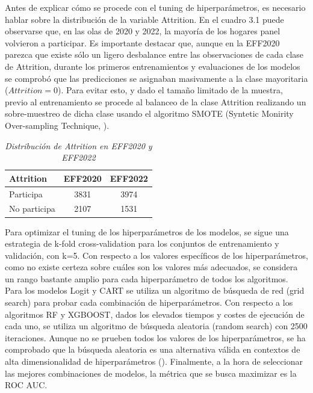 Antes de explicar cómo se procede con el tuning de hiperparámetros, es necesario hablar sobre la distribución de la variable Attrition. En el cuadro 3.1 puede observarse que, en las olas de 2020 y 2022, la mayoría de los hogares panel volvieron a participar. Es importante destacar que, aunque en la EFF2020 parezca que existe sólo un ligero desbalance entre las observaciones de cada clase de Attrition, durante los primeros entrenamientos y evaluaciones de los modelos se comprobó que las predicciones se asignaban masivamente a la clase mayoritaria ($Attrition=0$). Para evitar esto, y dado el tamaño limitado de la muestra, previo al entrenamiento se procede al balanceo de la clase Attrition realizando un sobre-muestreo de dicha clase usando el algoritmo SMOTE (Syntetic Monirity Over-sampling Technique, \cite{chawla2002smote}).

\begin{table}[h]
    \centering{}
    \begin{tabular}{ | l | c | c |}
    \hline
    Attrition & EFF2020 & EFF2022 \\ \hline
    Participa & 3831 & 3974 \\ \hline
    No participa  & 2107 & 1531 \\
    \hline
    \end{tabular}
    \caption{\textit{Distribución de Attrition en EFF2020 y EFF2022}}
\end{table}

Para optimizar el tuning de los hiperparámetros de los modelos, se sigue una estrategia de k-fold cross-validation para los conjuntos de entrenamiento y validación, con k=5. Con respecto a los valores específicos de los hiperparámetros, como no existe certeza sobre cuáles son los valores más adecuados, se considera un rango bastante amplio para cada hiperparámetro de todos los algoritmos. Para los modelos Logit y CART se utiliza un algoritmo de búsqueda de red (grid search) para probar cada combinación de hiperparámetros. Con respecto a los algoritmos RF y XGBOOST, dados los elevados tiempos y costes de ejecución de cada uno, se utiliza un algoritmo de búsqueda aleatoria (random search) con 2500 iteraciones. Aunque no se prueben todos los valores de los hiperparámetros, se ha comprobado que la búsqueda aleatoria es una alternativa válida en contextos de alta dimensionalidad de hiperparámetros (\cite{bergstra2012random}). Finalmente, a la hora de seleccionar las mejores combinaciones de modelos, la métrica que se busca maximizar es la ROC AUC.